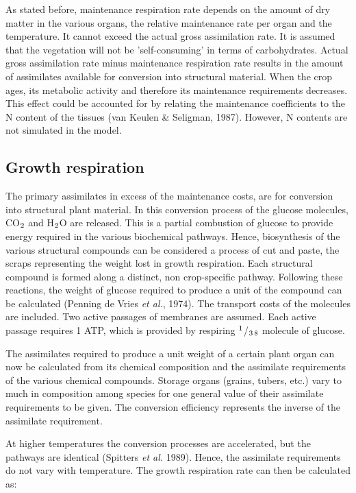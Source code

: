 As stated before, maintenance respiration rate depends on the amount of dry matter in the
various organs, the relative maintenance rate per organ and the temperature. It cannot
exceed the actual gross assimilation rate. It is assumed that the vegetation will not be
'self-consuming' in terms of carbohydrates. Actual gross assimilation rate minus 
mainten\-ance respiration rate results in the amount of assimilates available for conversion into
structural material. When the crop ages, its metabolic activity and therefore its
mainten\-ance require\-ments decreases. This effect could be accounted for by relating 
the mainten\-ance coefficients to the N content of the tissues (van Keulen \& Seligman, 1987).
However, N contents are not simulated in the model. 

\subsection{Growth respiration}

The primary assimilates in excess of the maintenance costs, are for conversion into
structural plant material. In this conversion process of the glucose molecules, CO$_{{\rm 2}}$ and
H$_{{\rm 2}}$O are released. This is a partial combustion of glucose to provide energy required in
the various biochemical pathways. Hence, biosynthesis of the various structural com\-pounds can 
be considered a process of cut and paste, the scraps representing the weight
lost in growth respiration.
Each structural compound is formed along a distinct, non crop-specific pathway.
Following these reactions, the weight of glucose required to produce a unit of the
compound can be calculated (Penning de Vries {\it et al.}, 1974). The transport costs of the
molecules are included. Two active passages of membranes are assumed. Each active
passage requires 1 ATP, which is provided by respiring $^{{\rm 1}}$/$_{{\rm 3}}$$_{{\rm 8}}$ molecule of glucose.

The assimilates required to produce a unit weight of a certain plant organ can now be
calculated from its chemical composition and the assimilate requirements of the various
chemical com\-pounds. Storage organs (grains, tubers, etc.) vary to much in composition
among species for one general value of their assimilate requirements to be given. The
conversion efficiency represents the inverse of the assimilate require\-ment.

At higher temperatures the conversion processes are accelerated, but the pathways are
identical (Spitters {\it et al.} 1989). Hence, the assimilate requirements do not vary with
temperature. The growth respiration rate can then be calculated as:

